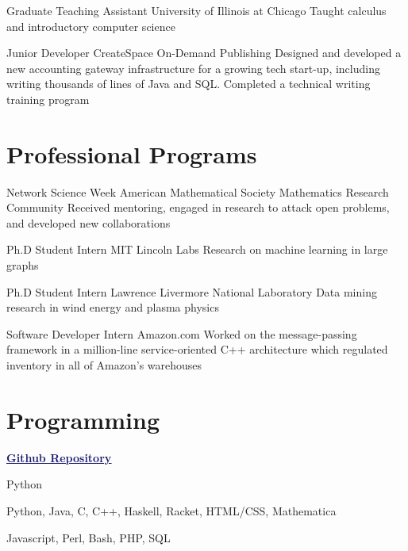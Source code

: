\documentclass[11pt]{moderncv}
\begin{document}
         {Graduate Teaching Assistant}
      {University of Illinois at Chicago}
      {}
      {}
      {Taught calculus and introductory computer science}

         {Junior Developer}
      {CreateSpace On-Demand Publishing}
      {}
      {}
      {Designed and developed a new accounting gateway infrastructure for a growing tech start-up, including writing thousands of lines of Java and SQL. Completed a technical writing training program}


   \section{Professional Programs}
         {Network Science Week}
      {American Mathematical Society Mathematics Research Community}
      {}
      {}
      {Received mentoring, engaged in research to attack open problems, and developed new collaborations}

         {Ph.D Student Intern}
      {MIT Lincoln Labs}
      {}
      {}
      {Research on machine learning in large graphs}

         {Ph.D Student Intern}
      {Lawrence Livermore National Laboratory}
      {}
      {}
      {Data mining research in wind energy and plasma physics}

         {Software Developer Intern}
      {Amazon.com}
      {}
      {}
      {Worked on the message-passing framework in a million-line service-oriented C++ architecture which regulated inventory in all of Amazon's warehouses}


   \section{Programming}
         {\href{https://github.com/j2kun/}{\textcolor{MidnightBlue}{\underline{\textbf{Github Repository}}}}}
      {}
{}
      {}
      {}

         {Python}
      {}
{}
      {}
      {}

         {Python, Java, C, C++, Haskell, Racket, HTML/CSS, Mathematica}
      {}
{}
      {}
      {}

         {Javascript, Perl, Bash, PHP, SQL}
      {}
{}
      {}
      {}
\end{document}
